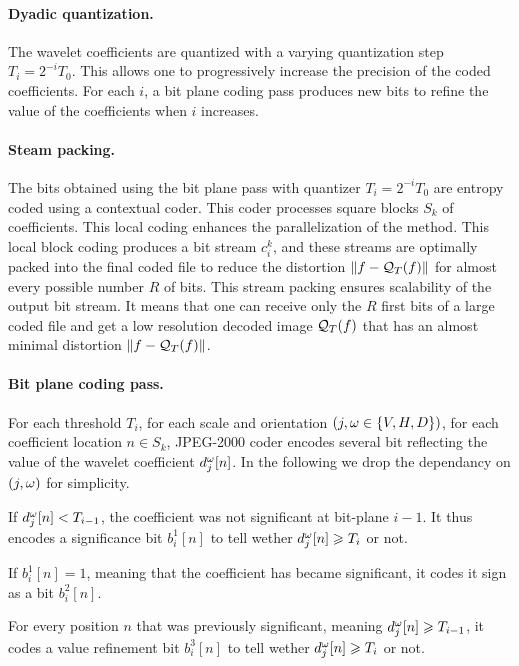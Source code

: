 \paragraph{Dyadic quantization.}

The wavelet coefficients are quantized with a varying quantization step $T_i = 2^{-i}T_0$. This allows one to progressively increase the precision of the coded coefficients. For each $i$, a bit plane coding pass produces new bits to refine the value of the coefficients when $i$ increases. 

\paragraph{Steam packing.}
The bits obtained using the bit plane pass with quantizer $T_i = 2^{-i}T_0$ are entropy coded using a contextual coder. This coder processes square blocks $S_k$ of coefficients. This local coding enhances the parallelization of the method. This local block coding produces a bit stream $c_i^k$, and these streams are optimally packed into the final coded file to reduce the distortion $\left\| f-\mathcal{Q}_T(f) \right\|$ for almost every possible number $R$ of bits. This stream packing ensures scalability of the output bit stream. It means that one can receive only the $R$ first bits of a large coded file and get a low resolution decoded image $\mathcal{Q}_T(f)$ that has an almost minimal distortion $\left\| f-\mathcal{Q}_T(f) \right\|$.

\paragraph{Bit plane coding pass.}

For each threshold $T_i$, for each scale and orientation $(j,\omega \in \{V,H,D\})$, for each coefficient location $n \in S_k$, JPEG-2000 coder encodes several bit reflecting the value of the wavelet coefficient $d_j^\omega[n]$. In the following we drop the dependancy on $(j,\omega)$ for simplicity.
\begin{rs}
	\item If $d_j^\omega[n] < T_{i-1}$, the coefficient was not significant at bit-plane $i-1$. It thus encodes a significance bit
		$b_i^1[n]$ to tell wether $d_j^\omega[n] \geqslant T_{i}$ or not.
	\item If $b_i^1[n]=1$, meaning that the coefficient has became significant, it codes it sign as a bit $b_i^2[n]$.
	\item For every position $n$ that was previously significant, meaning $d_j^\omega[n] \geqslant T_{i-1}$, it codes a value refinement bit
		 $b_i^3[n]$ to tell wether $d_j^\omega[n] \geqslant T_{i}$ or not.
\end{rs}

